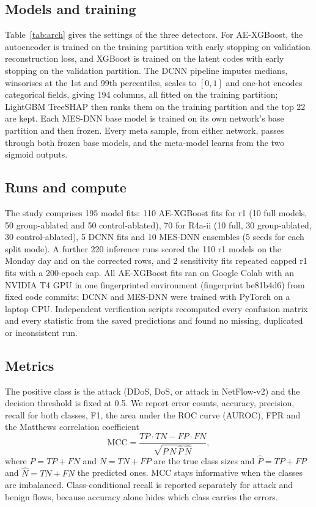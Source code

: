 \documentclass[journal]{IEEEtran}
\begin{document}
\subsection{Models and training}
Table~\ref{tab:arch} gives the settings of the three detectors. For AE-XGBoost, the autoencoder is trained on the training partition with
early stopping on validation reconstruction loss, and XGBoost is trained on the latent codes with
early stopping on the validation partition. The DCNN pipeline imputes medians, winsorises at the
1st and 99th percentiles, scales to $[0,1]$ and one-hot encodes categorical fields, giving 194
columns, all fitted on the training partition; LightGBM TreeSHAP then ranks them on the training
partition and the top 22 are kept. %
Each MES-DNN base model is trained on its own network's base partition and then frozen. Every
meta sample, from either network, passes through both frozen base models, and the meta-model
learns from the two sigmoid outputs.

\subsection{Runs and compute}
The study comprises 195 model fits: 110 AE-XGBoost fits for r1 (10 full models, 50 group-ablated
and 50 control-ablated), 70 for R4a-ii (10 full, 30 group-ablated, 30 control-ablated), 5 DCNN fits
and 10 MES-DNN ensembles (5 seeds for each split mode). A further 220 inference runs scored the 110
r1 models on the Monday day and on the corrected rows, and 2 sensitivity fits repeated capped r1
fits with a 200-epoch cap. %
All AE-XGBoost fits ran on Google Colab with an NVIDIA T4 GPU in one fingerprinted environment
(fingerprint be81b4d6) from fixed code commits; DCNN and MES-DNN were trained with PyTorch on a
laptop CPU. %
Independent verification scripts recomputed every confusion matrix and every statistic from the
saved predictions and found no missing, duplicated or inconsistent run. %

\subsection{Metrics}
The positive class is the attack (DDoS, DoS, or attack in NetFlow-v2) and the decision threshold is
fixed at 0.5. We report error counts, accuracy, precision, recall for both classes, F1, the area
under the ROC curve (AUROC), FPR and the Matthews correlation coefficient
\begin{equation}
\mathrm{MCC}=\frac{TP\cdot TN-FP\cdot FN}{\sqrt{P\,N\,\hat P\,\hat N}},
\label{eq:mcc}
\end{equation}
where $P=TP+FN$ and $N=TN+FP$ are the true class sizes and $\hat P=TP+FP$ and $\hat N=TN+FN$ the
predicted ones. MCC stays informative when the classes are imbalanced. Class-conditional recall is reported
separately for attack and benign flows, because accuracy alone hides which class carries the
errors.
\end{document}
